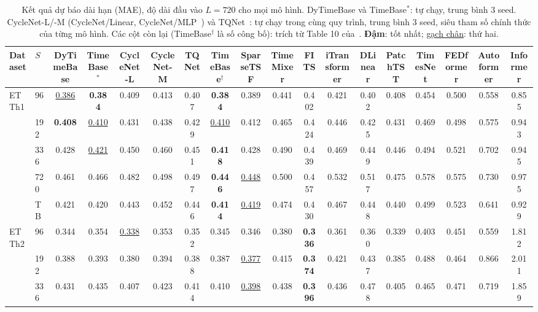 \begin{table}
\centering
\caption{Kết quả dự báo dài hạn (MAE), độ dài đầu vào $L=720$ cho mọi mô hình. DyTimeBase và TimeBase$^{*}$: tự chạy, trung bình 3 seed. CycleNet-L/-M (CycleNet/Linear, CycleNet/MLP~\cite{cyclenet}) và TQNet~\cite{tqnet}: tự chạy trong cùng quy trình, trung bình 3 seed, siêu tham số chính thức của từng mô hình. Các cột còn lại (TimeBase$^{\dagger}$ là số công bố): trích từ Table 10 của~\cite{timebase}. \textbf{Đậm}: tốt nhất; \underline{gạch chân}: thứ hai.}
\label{tab:acc-mae}
\scriptsize
\setlength{\tabcolsep}{2.4pt}
\begin{tabular}{@{}llcccccccccccccccc@{}}
\toprule
Dataset & $S$ & \textbf{DyTimeBase} & TimeBase$^{*}$ & CycleNet-L & CycleNet-M & TQNet & TimeBase$^{\dagger}$ & SparseTSF & TimeMixer & FITS & iTransformer & DLinear & PatchTST & TimesNet & FEDformer & Autoformer & Informer\\
\midrule
\multirow{5}{*}{ETTh1} & 96 & \underline{0.386} & \textbf{0.384} & 0.409 & 0.413 & 0.407 & \textbf{0.384} & 0.389 & 0.441 & 0.402 & 0.421 & 0.402 & 0.408 & 0.454 & 0.500 & 0.558 & 0.855\\
 & 192 & \textbf{0.408} & \underline{0.410} & 0.431 & 0.438 & 0.429 & \underline{0.410} & 0.412 & 0.465 & 0.424 & 0.446 & 0.425 & 0.431 & 0.469 & 0.498 & 0.575 & 0.943\\
 & 336 & 0.428 & \underline{0.421} & 0.450 & 0.460 & 0.451 & \textbf{0.418} & 0.428 & 0.490 & 0.439 & 0.469 & 0.449 & 0.446 & 0.494 & 0.521 & 0.702 & 0.945\\
 & 720 & 0.461 & 0.466 & 0.482 & 0.498 & 0.497 & \textbf{0.446} & \underline{0.448} & 0.500 & 0.457 & 0.532 & 0.517 & 0.475 & 0.578 & 0.575 & 0.730 & 0.975\\
 & TB & 0.421 & 0.420 & 0.443 & 0.452 & 0.446 & \textbf{0.414} & \underline{0.419} & 0.474 & 0.430 & 0.467 & 0.448 & 0.440 & 0.499 & 0.523 & 0.641 & 0.929\\
\midrule
\multirow{5}{*}{ETTh2} & 96 & 0.344 & 0.354 & \underline{0.338} & 0.353 & 0.352 & 0.345 & 0.346 & 0.380 & \textbf{0.336} & 0.361 & 0.360 & 0.339 & 0.403 & 0.451 & 0.559 & 1.812\\
 & 192 & 0.388 & 0.393 & 0.380 & 0.394 & 0.388 & 0.387 & \underline{0.377} & 0.415 & \textbf{0.374} & 0.421 & 0.437 & 0.385 & 0.488 & 0.464 & 0.866 & 2.011\\
 & 336 & 0.431 & 0.435 & 0.407 & 0.423 & 0.414 & 0.410 & \underline{0.398} & 0.438 & \textbf{0.396} & 0.436 & 0.478 & 0.405 & 0.465 & 0.471 & 0.719 & 1.859\\

\end{tabular}
\end{table}
